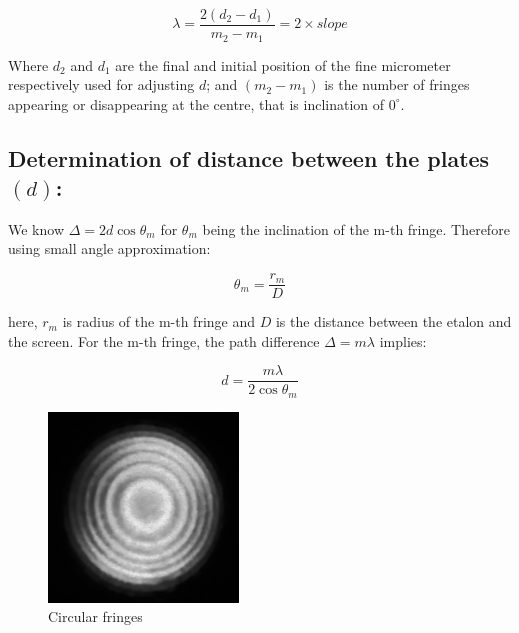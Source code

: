		\begin{equation}
			\lambda = \frac{2(d_2-d_1)}{m_2-m_1} = 2\times slope
			\label{eq:1}
		\end{equation}

		Where $d_2$ and $d_1$ are the final and initial position of the
		fine micrometer respectively used for adjusting $d$; and
		$(m_2 - m_1)$ is the number of fringes appearing or disappearing
		at the centre, that is inclination of $0^\circ$.

	\subsection{Determination of distance between the plates $(d)$:}

		We know $\Delta = 2d\cos\theta_m$ for $\theta_m$ being the inclination of the m-th fringe. Therefore using small angle approximation:

			$$\theta_m = \frac{r_m}{D}$$

		here, $r_m$ is radius of the m-th fringe and $D$ is the distance between the etalon and the screen. For the m-th fringe, the path difference $\Delta = m\lambda$ implies:
		
		\begin{equation}
			d= \frac{m\lambda}{2\cos\theta_m}
			\label{eq:2}
		\end{equation}

		\begin{figure}[H]
			\centering
			\includegraphics[width=0.45\textwidth]{images/1.png}
			\caption{Circular fringes}
			\label{fig:3}
		\end{figure}